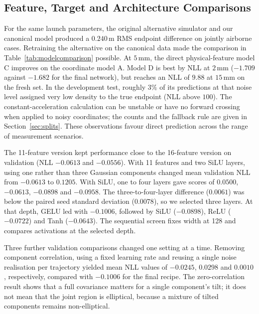 \documentclass[11pt,a4paper]{article}
\begin{document}
\subsection{Feature, Target and Architecture Comparisons}
\label{sec:comparisons}

For the same launch parameters, the original alternative simulator and our canonical model produced a $0.240\,\mathrm{m}$ RMS endpoint difference on jointly airborne cases. Retraining the alternative on the canonical data made the comparison in Table~\ref{tab:modelcomparison} possible. At $5\,\mathrm{mm}$, the direct physical-feature model C improves on the coordinate model A. Model D is best by NLL at $2\,\mathrm{mm}$ ($-1.709$ against $-1.682$ for the final network), but reaches an NLL of $9.88$ at $15\,\mathrm{mm}$ on the fresh set. In the development test, roughly $3\%$ of its predictions at that noise level assigned very low density to the true endpoint (NLL above $100$). The constant-acceleration calculation can be unstable or have no forward crossing when applied to noisy coordinates; the counts and the fallback rule are given in Section~\ref{sec:splits}. These observations favour direct prediction across the range of measurement scenarios.

The 11-feature version kept performance close to the 16-feature version on validation (NLL $-0.0613$ and $-0.0556$). With 11 features and two SiLU layers, using one rather than three Gaussian components changed mean validation NLL from $-0.0613$ to $0.1205$. With SiLU, one to four layers gave scores of $0.0500$, $-0.0613$, $-0.0898$ and $-0.0958$. The three-to-four-layer difference ($0.0061$) was below the paired seed standard deviation ($0.0078$), so we selected three layers. At that depth, GELU led with $-0.1006$, followed by SiLU ($-0.0898$), ReLU ($-0.0722$) and Tanh ($-0.0643$). The sequential screen fixes width at 128 and compares activations at the selected depth.

Three further validation comparisons changed one setting at a time. Removing component correlation, using a fixed learning rate and reusing a single noise realisation per trajectory yielded mean NLL values of $-0.0245$, $0.0298$ and $0.0010$, respectively, compared with $-0.1006$ for the final recipe. The zero-correlation result shows that a full covariance matters for a single component's tilt; it does not mean that the joint region is elliptical, because a mixture of tilted components remains non-elliptical.
\end{document}
